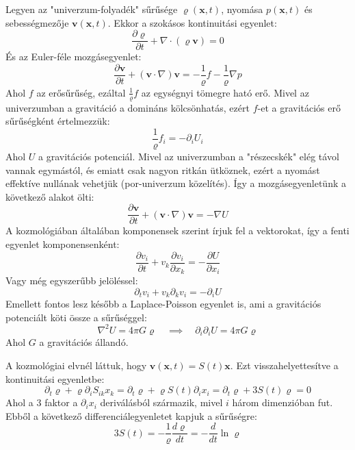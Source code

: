 \documentclass[../main.tex]{subfiles}
\begin{document}
Legyen az "univerzum-folyadék" sűrűsége $\varrho(\mathbf{x}, t)$, nyomása $p(\mathbf{x}, t)$ és sebességmezője $\mathbf{v}(\mathbf{x}, t)$. Ekkor a szokásos kontinuitási egyenlet:
\begin{equation}
    \boxed{\frac{\partial \varrho}{\partial t} + \nabla \cdot (\varrho \mathbf{v}) = 0}
\end{equation}
És az Euler-féle mozgásegyenlet:
\begin{equation}
    \frac{\partial \mathbf{v}}{\partial t} + (\mathbf{v} \cdot \nabla) \mathbf{v} = - \frac{1}{\varrho} f - \frac{1}{\varrho} \nabla p
\end{equation}
Ahol $f$ az erősűrűség, ezáltal $\frac{1}{\varrho} f$ az egységnyi tömegre ható erő. Mivel az univerzumban a gravitáció a domináns kölcsönhatás, ezért $f$-et a gravitációs erő sűrűségként értelmezzük:
\begin{equation}
    \frac{1}{\varrho} f_i = - \partial_i U_i
\end{equation}
Ahol $U$ a gravitációs potenciál. Mivel az univerzumban a "részecskék" elég távol vannak egymástól, és emiatt csak nagyon ritkán ütköznek, ezért a nyomást effektíve nullának vehetjük (por-univerzum közelítés). Így a mozgásegyenletünk a következő alakot ölti:
\begin{equation}
    \frac{\partial \mathbf{v}}{\partial t} + (\mathbf{v} \cdot \nabla) \mathbf{v} = - \nabla U
\end{equation}
A kozmológiában általában komponensek szerint írjuk fel a vektorokat, így a fenti egyenlet komponensenként:
\begin{equation}
    \frac{\partial v_i}{\partial t} + v_k \frac{\partial v_i}{\partial x_k} = - \frac{\partial U}{\partial x_i}
\end{equation}
Vagy még egyszerűbb jelöléssel:
\begin{equation}
    \boxed{\partial_t v_i + v_k \partial_k v_i = - \partial_i U}
\end{equation}
Emellett fontos lesz később a Laplace-Poisson egyenlet is, ami a gravitációs potenciált köti össze a sűrűséggel:
\begin{equation}
    \nabla^2 U = 4 \pi G \varrho \quad \implies \quad \boxed{\partial_i \partial_i U = 4 \pi G \varrho}
\end{equation}
Ahol $G$ a gravitációs állandó.

A kozmológiai elvnél láttuk, hogy $\mathbf{v}(\mathbf{x}, t) = S(t) \mathbf{x}$. Ezt visszahelyettesítve a kontinuitási egyenletbe:
\begin{equation}
    \partial_t \varrho + \varrho \partial_i S_{ik} x_k = \partial_t \varrho + \varrho S(t) \partial_i x_i = \partial_t \varrho + 3 S(t) \varrho = 0
\end{equation}
Ahol a $3$ faktor a $\partial_i x_i$ deriválásból származik, mivel $i$ három dimenzióban fut. Ebből a következő differenciálegyenletet kapjuk a sűrűségre:
\begin{equation}
    3S(t) = -\frac{1}{\varrho} \frac{d \varrho}{d t} = -\frac{d}{d t} \ln \varrho
\end{equation}
\end{document}
